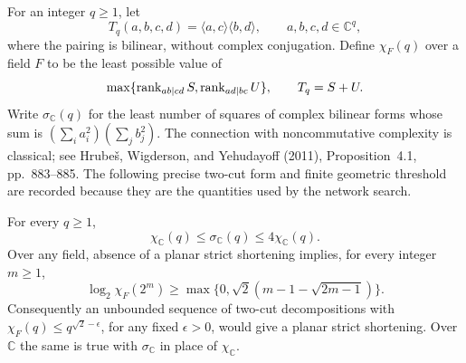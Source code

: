 For an integer $q\geq1$, let
\[
 T_q(a,b,c,d)=\langle a,c\rangle\langle b,d\rangle,
 \qquad a,b,c,d\in\mathbb C^q,
\]
where the pairing is bilinear, without complex conjugation. Define
$\chi_F(q)$ over a field $F$ to be the least possible value of
\[
 \max\{\operatorname{rank}_{ab\mid cd}S,\operatorname{rank}_{ad\mid bc}U\},
 \qquad T_q=S+U.
\]
Write $\sigma_{\mathbb C}(q)$ for the least number of squares of complex
bilinear forms whose sum is
$(\sum_i a_i^2)(\sum_j b_j^2)$. The connection with noncommutative
complexity is classical; see Hrube\v{s}, Wigderson, and Yehudayoff
(2011), Proposition~4.1, pp.~883--885. The following precise two-cut
form and finite geometric threshold are recorded because they are
the quantities used by the network search.

\begin{proposition}
\label{rt:sos}
For every $q\geq1$,
\[
 \chi_{\mathbb C}(q)\leq\sigma_{\mathbb C}(q)
 \leq4\chi_{\mathbb C}(q).
\]
Over any field, absence of a planar strict shortening implies, for
every integer $m\geq1$,
\[
 \log_2\chi_F(2^m)\geq
 \max\{0,\sqrt2(m-1-\sqrt{2m-1})\}.
\]
Consequently an unbounded sequence of two-cut decompositions with
$\chi_F(q)\leq q^{\sqrt2-\epsilon}$, for any fixed $\epsilon>0$,
would give a planar strict shortening. Over $\mathbb C$ the same is
true with $\sigma_{\mathbb C}$ in place of $\chi_{\mathbb C}$.
\end{proposition}
